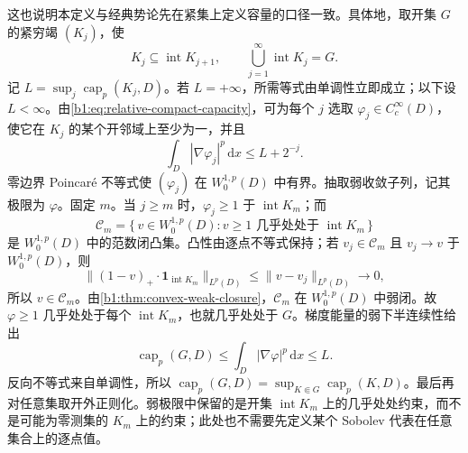 这也说明本定义与经典势论先在紧集上定义容量的口径一致。具体地，取开集 \(G\) 的紧穷竭 \((K_j)\)，使
\[
 K_j\subseteq\operatorname{int}K_{j+1},\qquad
 \bigcup_{j=1}^{\infty}\operatorname{int}K_j=G.
\]
记 \(L=\sup_j\operatorname{cap}_p(K_j,D)\)。若 \(L=+\infty\)，所需等式由单调性立即成立；以下设 \(L<\infty\)。由\eqref{b1:eq:relative-compact-capacity}，可为每个 \(j\) 选取 \(\varphi_j\in C_c^\infty(D)\)，使它在 \(K_j\) 的某个开邻域上至少为一，并且
\[
 \int_D|\nabla\varphi_j|^p\,\mathrm dx\le L+2^{-j}.
\]
零边界 Poincaré 不等式使 \((\varphi_j)\) 在 \(W_0^{1,p}(D)\) 中有界。抽取弱收敛子列，记其极限为 \(\varphi\)。固定 \(m\)。当 \(j\ge m\) 时，\(\varphi_j\ge1\) 于 \(\operatorname{int}K_m\)；而
\[
 \mathcal C_m=\{\,v\in W_0^{1,p}(D):v\ge1\text{ 几乎处处于 }\operatorname{int}K_m\,\}
\]
是 \(W_0^{1,p}(D)\) 中的范数闭凸集。凸性由逐点不等式保持；若 \(v_j\in\mathcal C_m\) 且 \(v_j\to v\) 于 \(W_0^{1,p}(D)\)，则
\[
 \|(1-v)_+\cdot\mathbf1_{\operatorname{int}K_m}\|_{L^p(D)}
 \le\|v-v_j\|_{L^p(D)}\longrightarrow0,
\]
所以 \(v\in\mathcal C_m\)。由\cref{b1:thm:convex-weak-closure}，\(\mathcal C_m\) 在 \(W_0^{1,p}(D)\) 中弱闭。故 \(\varphi\ge1\) 几乎处处于每个 \(\operatorname{int}K_m\)，也就几乎处处于 \(G\)。梯度能量的弱下半连续性给出
\[
 \operatorname{cap}_p(G,D)\le\int_D|\nabla\varphi|^p\,\mathrm dx\le L.
\]
反向不等式来自单调性，所以
\(\operatorname{cap}_p(G,D)=\sup_{K\Subset G}\operatorname{cap}_p(K,D)\)。最后再对任意集取开外正则化。弱极限中保留的是开集 \(\operatorname{int}K_m\) 上的几乎处处约束，而不是可能为零测集的 \(K_m\) 上的约束；此处也不需要先定义某个 Sobolev 代表在任意集合上的逐点值。

